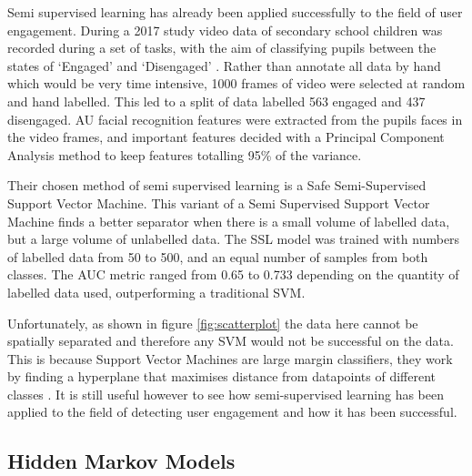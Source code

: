 \documentclass{article}
\begin{document}
Semi supervised learning has already been applied successfully to the field of user engagement.
During a 2017 study video data of secondary school children was recorded during a set of tasks, with the aim of classifying pupils between the states of `Engaged' and `Disengaged' \cite{nezami2017semi}.
Rather than annotate all data by hand which would be very time intensive, 1000 frames of video were selected at random and hand labelled.
This led to a split of data labelled 563 engaged and 437 disengaged.
AU facial recognition features were extracted from the pupils faces in the video frames, and important features decided with a Principal Component Analysis method to keep features totalling 95\% of the variance.

Their chosen method of semi supervised learning is a Safe Semi-Supervised Support Vector Machine.
This variant of a Semi Supervised Support Vector Machine finds a better separator when there is a small volume of labelled data, but a large volume of unlabelled data.
The SSL model was trained with numbers of labelled data from 50 to 500, and an equal number of samples from both classes.
The AUC metric ranged from 0.65 to 0.733 depending on the quantity of labelled data used, outperforming a traditional SVM.

Unfortunately, as shown in figure \ref{fig:scatterplot} the data here cannot be spatially separated and therefore any SVM would not be successful on the data.
This is because Support Vector Machines are large margin classifiers, they work by finding a hyperplane that maximises distance from datapoints of different classes \cite{campbell2000query}. 
It is still useful however to see how semi-supervised learning has been applied to the field of detecting user engagement and how it has been successful.

%   

\subsection{Hidden Markov Models}
\end{document}
